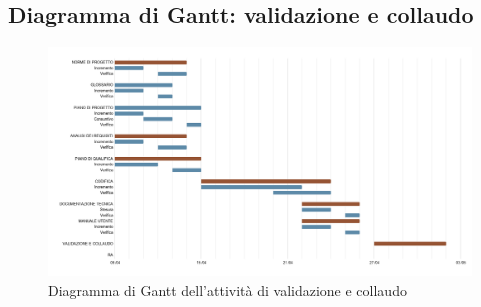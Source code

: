 \subsection{Diagramma di Gantt: validazione e collaudo}\label{PianificazioneDiagrammaDiGanttValidazione}
\begin{figure}[!h]
	\begin{center}
		\includegraphics[width=0.8\linewidth]{../immagini/pdp/gantt_validazione.png}
		\caption{Diagramma di Gantt dell'attività di validazione e collaudo}
	\end{center}
\end{figure}
